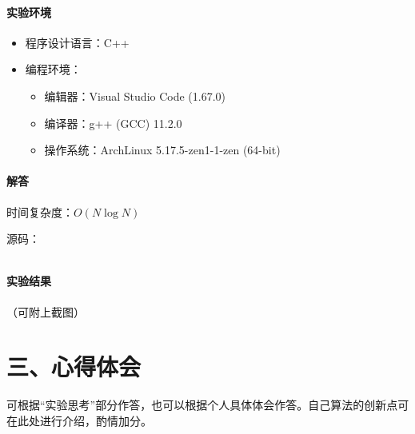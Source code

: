 \documentclass[12pt,a4paper]{ctexart}
\begin{document}
\vspace{5pt}

\paragraph{实验环境}
\begin{itemize}
    \item 程序设计语言：C++
    \item 编程环境：
    \begin{itemize}
        \item 编辑器：Visual Studio Code (1.67.0)
        \item 编译器：g++ (GCC) 11.2.0
        \item 操作系统：ArchLinux 5.17.5-zen1-1-zen (64-bit)
    \end{itemize}
\end{itemize}

\newpage

\paragraph{解答} 时间复杂度：$O(N \log N)$

源码：
\inputminted[bgcolor=codebg,frame=lines,autogobble,linenos=true,breaklines]{cpp}{src/t3.cpp}

\vspace{5pt}

\paragraph{实验结果}
（可附上截图）

\newpage

\vspace{5pt}

\section*{三、心得体会}
    可根据“实验思考”部分作答，也可以根据个人具体体会作答。自己算法的创新点可在此处进行介绍，酌情加分。
\end{document}
